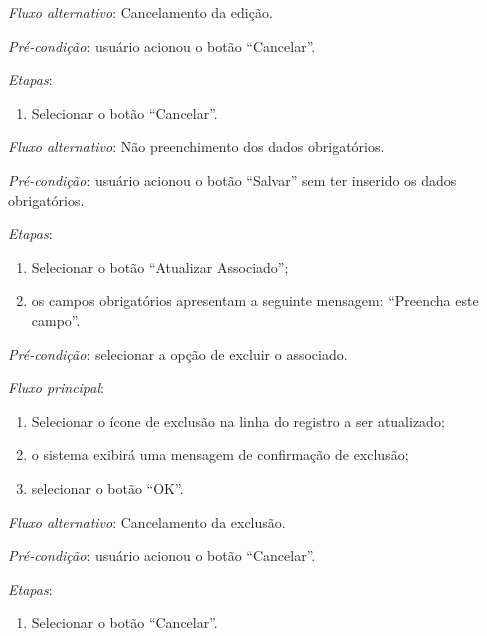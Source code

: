 \noindent \textit{Fluxo alternativo}: Cancelamento da edição.

\noindent \textit{Pré-condição}: usuário acionou o botão ``Cancelar''.

\noindent \textit{Etapas}:

\begin{enumerate}
    \item Selecionar o botão ``Cancelar''.
\end{enumerate}

\noindent \textit{Fluxo alternativo}: Não preenchimento dos dados obrigatórios.

\noindent \textit{Pré-condição}: usuário acionou o botão ``Salvar'' sem ter inserido os dados obrigatórios.

\noindent \textit{Etapas}:

\begin{enumerate}
    \item Selecionar o botão ``Atualizar Associado'';
    \item os campos obrigatórios apresentam a seguinte mensagem: ``Preencha este campo''.
\end{enumerate}



\vspace{0.7cm}

\noindent \textit{Pré-condição}: selecionar a opção de excluir o associado.

\noindent \textit{Fluxo principal}:

\begin{enumerate}
    \item Selecionar o ícone de exclusão na linha do registro a ser atualizado;
    \item o sistema exibirá uma mensagem de confirmação de exclusão;
    \item selecionar o botão ``OK''.
\end{enumerate}

\noindent \textit{Fluxo alternativo}: Cancelamento da exclusão.

\noindent \textit{Pré-condição}: usuário acionou o botão ``Cancelar''.

\noindent \textit{Etapas}:

\begin{enumerate}
    \item Selecionar o botão ``Cancelar''.
\end{enumerate}



